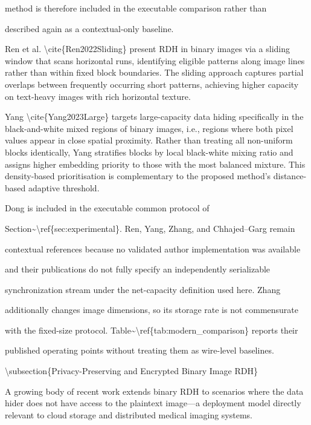 \documentclass[a4paper,fleqn]{cas-dc}
\newenvironment{RevisionDeletion}{%
  \par\begingroup\color{revisionred}\footnotesize\ttfamily
  \setlength{\parindent}{0pt}\setlength{\parskip}{1pt}\obeyspaces
}{\par\endgroup}
\begin{document}
\begin{RevisionDeletion}
method is therefore included in the executable comparison rather than\par
described again as a contextual-only baseline.\par
\par
Ren et al. \textbackslash{}cite\{Ren2022Sliding\} present RDH in binary images via a sliding window that scans horizontal runs, identifying eligible patterns along image lines rather than within fixed block boundaries. The sliding approach captures partial overlaps between frequently occurring short patterns, achieving higher capacity on text-heavy images with rich horizontal texture.\par
\par
Yang \textbackslash{}cite\{Yang2023Large\} targets large-capacity data hiding specifically in the black-and-white mixed regions of binary images, i.e., regions where both pixel values appear in close spatial proximity. Rather than treating all non-uniform blocks identically, Yang stratifies blocks by local black-white mixing ratio and assigns higher embedding priority to those with the most balanced mixture. This density-based prioritisation is complementary to the proposed method's distance-based adaptive threshold.\par
\par
Dong is included in the executable common protocol of\par
Section\textasciitilde{}\textbackslash{}ref\{sec:experimental\}. Ren, Yang, Zhang, and Chhajed--Garg remain\par
contextual references because no validated author implementation was available\par
and their publications do not fully specify an independently serializable\par
synchronization stream under the net-capacity definition used here. Zhang\par
additionally changes image dimensions, so its storage rate is not commensurate\par
with the fixed-size protocol. Table\textasciitilde{}\textbackslash{}ref\{tab:modern\_comparison\} reports their\par
published operating points without treating them as wire-level baselines.\par
\par
\textbackslash{}subsection\{Privacy-Preserving and Encrypted Binary Image RDH\}\par
\par
A growing body of recent work extends binary RDH to scenarios where the data hider does not have access to the plaintext image---a deployment model directly relevant to cloud storage and distributed medical imaging systems.\par

\end{RevisionDeletion}
\end{document}
